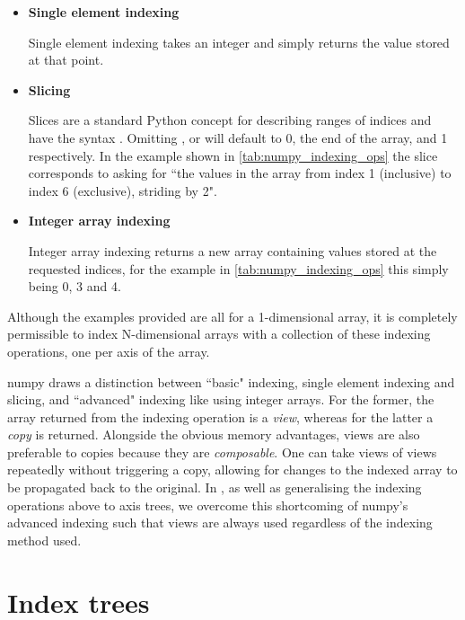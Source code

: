 \documentclass[thesis]{subfiles}
\begin{document}
\begin{itemize}
  \item \textbf{Single element indexing}

    Single element indexing takes an integer and simply returns the value stored at that point.

  \item \textbf{Slicing}

    Slices are a standard Python concept for describing ranges of indices and have the syntax .
    Omitting ,  or  will default to 0, the end of the array, and 1 respectively.
    In the example shown in \cref{tab:numpy_indexing_ops} the slice \pycode{[1:6:2]} corresponds to asking for ``the values in the array from index 1 (inclusive) to index 6 (exclusive), striding by 2".

  \item \textbf{Integer array indexing}

    Integer array indexing returns a new array containing values stored at the requested indices, for the example in \cref{tab:numpy_indexing_ops} this simply being 0, 3 and 4.

\end{itemize}

Although the examples provided are all for a 1-dimensional array, it is completely permissible to index N-dimensional arrays with a collection of these indexing operations, one per axis of the array.

numpy draws a distinction between ``basic" indexing, single element indexing and slicing, and ``advanced" indexing like using integer arrays.
For the former, the array returned from the indexing operation is a \textit{view}, whereas for the latter a \textit{copy} is returned.
Alongside the obvious memory advantages, views are also preferable to copies because they are \textit{composable}.
One can take views of views repeatedly without triggering a copy, allowing for changes to the indexed array to be propagated back to the original.
In , as well as generalising the indexing operations above to axis trees, we overcome this shortcoming of numpy's advanced indexing such that views are always used regardless of the indexing method used.

\section{Index trees}
\label{sec:index_trees}
\end{document}
